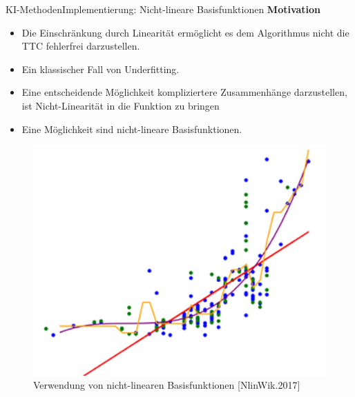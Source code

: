 \documentclass[169, handout	]{THIbeamer} %
\begin{document}
	\begin{frame}{KI-Methoden}{Implementierung: Nicht-lineare Basisfunktionen}
		\small		
		\textbf{Motivation}
		\footnotesize
		\begin{itemize}
			\item Die Einschränkung durch Linearität ermöglicht es dem Algorithmus nicht die TTC fehlerfrei darzustellen.
			\item Ein klassischer Fall von Underfitting.
			\item Eine entscheidende Möglichkeit kompliziertere Zusammenhänge darzustellen, ist Nicht-Linearität in die Funktion zu bringen
			\item Eine Möglichkeit sind nicht-lineare Basisfunktionen. 
		\end{itemize}					
		\begin{figure}
			\includegraphics[scale=0.45]{required/Nicht_lineare_Regression.jpg}
			\caption{\scriptsize Verwendung von nicht-linearen Basisfunktionen [NlinWik.2017]}
        	\label{Over and Underfitting}
		\end{figure}
	\end{frame}
\end{document}
